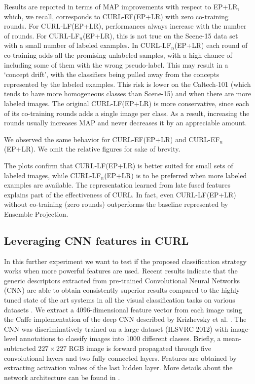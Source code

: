 \documentclass[journal,11pt]{IEEEtran}
\newcommand{\ADD}[1]{#1}
\newcommand{\coso}{strategy}
\newcommand{\curlef}{CURL-EF(EP+LR)}
\newcommand{\curllf}{CURL-LF(EP+LR)}
\newcommand{\curlefn}{CURL-EF$_n$(EP+LR)}
\newcommand{\curllfn}{CURL-LF$_n$(EP+LR)}
\begin{document}
%
Results are reported in terms of MAP
improvements with respect to EP\ADD{+LR}, which, we recall, corresponds to
\curlef{ }with zero co-training rounds. For \curllf, performances always
increase with the number of rounds. For \curllfn, this is not true on
the Scene-15 data set with a small number of labeled examples.  In
\curllfn{ }each round of co-training adds all the promising unlabeled
samples, with a high chance of including some of them with the wrong
pseudo-label. This may result in a `concept drift', with the
classifiers being pulled away from the concepts represented by the
labeled examples.  This risk is lower on the Caltech-101 (which tends
to have more homogeneous classes than Scene-15) and when there are
more labeled images. The original \curllf{ }is more conservative, since
each of its co-training rounds adds a single image per class.  As a
result, increasing the rounds usually increases MAP and never decreases it by an 
appreciable amount.

We observed the same behavior for \curlef{ }and \curlefn. We omit the relative figures for sake of brevity. %

%
The plots confirm that \curllf{ }is better suited for small sets of
labeled images, while \curllfn{ }is to be preferred when more labeled
examples are available. The representation learned from late fused
features explains part of the effectiveness of CURL. In fact, even
\curllf{ }without co-training (zero rounds) outperforms the baseline
represented by Ensemble Projection.



\subsection{Leveraging CNN features in CURL}
\label{subsec:cnn}
In this further experiment we want to test if the proposed classification \coso{ }works when more powerful features are used. Recent results indicate that the generic descriptors extracted from pre-trained Convolutional Neural Networks (CNN) are able to obtain consistently superior results compared to the highly tuned state of the art systems in all the visual classification tasks on various datasets \cite{razavian2014cnn}. 
We extract a 4096-dimensional feature vector from each image using the Caffe \cite{jia2014caffe} implementation of the deep CNN described by Krizhevsky et al. \cite{krizhevsky2012imagenet}.  
The CNN was discriminatively trained on a large dataset (ILSVRC 2012) with image-level annotations to classify images into 1000 different classes. 
Briefly, a mean-subtracted $227 \times 227$ RGB image is forward propagated through five convolutional layers and two fully connected layers. Features are obtained by extracting activation values of the last hidden layer. More details about the network architecture can be found in \cite{krizhevsky2012imagenet,jia2014caffe}.
\end{document}
